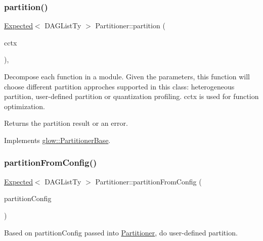 \subsubsection{\texorpdfstring{partition()}{partition()}}
{\footnotesize\ttfamily \hyperlink{classglow_1_1detail_1_1_glow_expected}{Expected}$<$ D\+A\+G\+List\+Ty $>$ Partitioner\+::partition (\begin{DoxyParamCaption}\item[{\hyperlink{structglow_1_1_compilation_context}{Compilation\+Context} \&}]{cctx }\end{DoxyParamCaption})\hspace{0.3cm}{\ttfamily [override]}, {\ttfamily [virtual]}}

Decompose each function in a module. Given the parameters, this function will choose different partition approches supported in this class\+: heterogeneous partition, user-\/defined partition or quantization profiling. {\ttfamily cctx} is used for function optimization. \begin{DoxyReturn}{Returns}
the partition result or an error. 
\end{DoxyReturn}


Implements \hyperlink{classglow_1_1_partitioner_base_ac51c9b3cf875b52d6aa0282aebcc941d}{glow\+::\+Partitioner\+Base}.

\mbox{\label{classglow_1_1_partitioner_a8d9623d32a7ebfc467e2baea9eb8ae7a}} 
\subsubsection{\texorpdfstring{partition\+From\+Config()}{partitionFromConfig()}}
{\footnotesize\ttfamily \hyperlink{classglow_1_1detail_1_1_glow_expected}{Expected}$<$ D\+A\+G\+List\+Ty $>$ Partitioner\+::partition\+From\+Config (\begin{DoxyParamCaption}\item[{const \hyperlink{structglow_1_1runtime_1_1_partition_config}{Partition\+Config} \&}]{partition\+Config }\end{DoxyParamCaption})}

Based on {\ttfamily partition\+Config} passed into \hyperlink{classglow_1_1_partitioner}{Partitioner}, do user-\/defined partition. \mbox{\label{classglow_1_1_partitioner_afa9a4f53e01814f1ddd292af1fecff4a}} 

